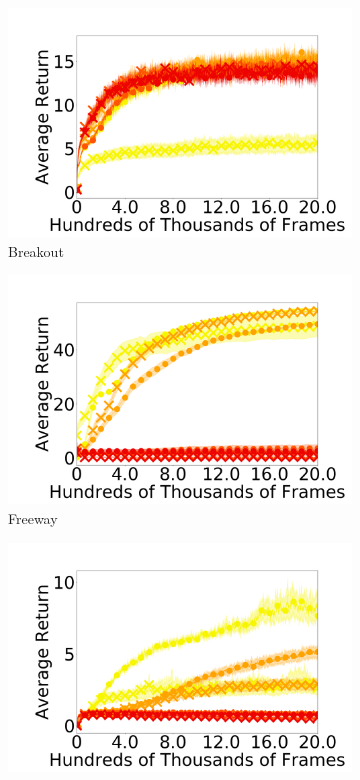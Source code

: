 \documentclass[twoside,11pt]{article}
\begin{document}
\begin{figure}[t]
  \begin{subfigure}[b]{0.25\linewidth}
    \centering
    \includegraphics[width=\columnwidth]{figs/deep/discrete/UNLABELED_breakout_all_kl.png} 
    \caption{Breakout
    }\label{fig:breakout}
  \end{subfigure}%
  \begin{subfigure}[b]{0.25\linewidth}
    \centering
    \includegraphics[width=\columnwidth]{figs/deep/discrete/UNLABELED_freeway_all_kl.png} 
    \caption{Freeway
    }\label{fig:freeway}
  \end{subfigure}%
  \begin{subfigure}[b]{0.25\linewidth}
    \centering
    \includegraphics[width=\columnwidth]{figs/deep/discrete/UNLABELED_seaquest_all_kl.png} 

\end{subfigure}
\end{figure}
\end{document}
